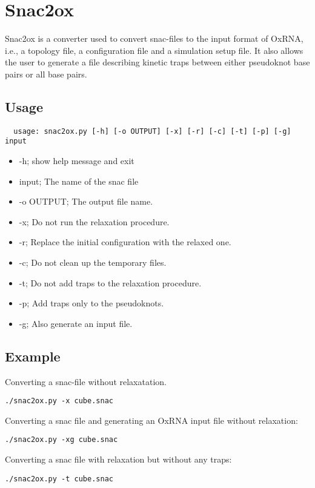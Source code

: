 \section{Snac2ox}
Snac2ox is a converter used to convert snac-files to the input format of OxRNA, i.e., a topology file, a configuration file and a simulation setup file. It also allows the user to generate a file describing kinetic traps between either pseudoknot base pairs or all base pairs.
\subsection{Usage}
\begin{verbatim}
  usage: snac2ox.py [-h] [-o OUTPUT] [-x] [-r] [-c] [-t] [-p] [-g] input
\end{verbatim}
\begin{itemize}
  \item -h; show help message and exit
  \item input; The name of the snac file
  \item -o OUTPUT; The output file name.
  \item -x; Do not run the relaxation procedure.
  \item -r; Replace the initial configuration with the relaxed one.
  \item -c; Do not clean up the temporary files.
  \item -t; Do not add traps to the relaxation procedure.
  \item -p; Add traps only to the pseudoknots.
  \item -g; Also generate an input file.
\end{itemize}
\subsection{Example}
Converting a snac-file without relaxatation.
\begin{verbatim}
./snac2ox.py -x cube.snac
\end{verbatim}
Converting a snac file and generating an OxRNA input file without relaxation:
\begin{verbatim}
./snac2ox.py -xg cube.snac
\end{verbatim}
Converting a snac file with relaxation but without any traps:
\begin{verbatim}
./snac2ox.py -t cube.snac
\end{verbatim}
